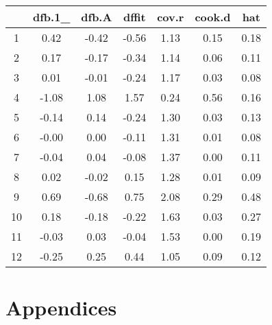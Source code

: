 \documentclass[12pt, a4paper]{report}
\theoremstyle{plain}
\theoremstyle{definition}
\theoremstyle{remark}
\begin{document}



\begin{table}[ht]
\begin{center}
\begin{tabular}{|c|c|c|c|c|c|c|}
  \hline
 & dfb.1\_ & dfb.A & dffit & cov.r & cook.d & hat \\
  \hline
1 & 0.42 & -0.42 & -0.56 & 1.13 & 0.15 & 0.18 \\
  2 & 0.17 & -0.17 & -0.34 & 1.14 & 0.06 & 0.11 \\
  3 & 0.01 & -0.01 & -0.24 & 1.17 & 0.03 & 0.08 \\
  4 & -1.08 & 1.08 & 1.57 & 0.24 & 0.56 & 0.16 \\
  5 & -0.14 & 0.14 & -0.24 & 1.30 & 0.03 & 0.13 \\
  6 & -0.00 & 0.00 & -0.11 & 1.31 & 0.01 & 0.08 \\
  7 & -0.04 & 0.04 & -0.08 & 1.37 & 0.00 & 0.11 \\
  8 & 0.02 & -0.02 & 0.15 & 1.28 & 0.01 & 0.09 \\
  9 & 0.69 & -0.68 & 0.75 & 2.08 & 0.29 & 0.48 \\
  10 & 0.18 & -0.18 & -0.22 & 1.63 & 0.03 & 0.27 \\
  11 & -0.03 & 0.03 & -0.04 & 1.53 & 0.00 & 0.19 \\
  12 & -0.25 & 0.25 & 0.44 & 1.05 & 0.09 & 0.12 \\
   \hline
\end{tabular}
\end{center}
\end{table}



\chapter{Appendices} %
\newpage
\end{document}
